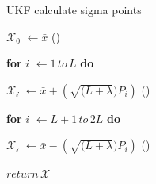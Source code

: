 \documentclass[../Head/report.tex]{subfiles}
\begin{document}
\begin{Pseudo}{UKF calculate sigma points}{}
\begin{Indentation}
	\item $\mathcal{X_0}$  \(\leftarrow \bar{x}\) \qquad {}(\theequation)\label{eq:update_zero_sigma_point}
	\item \textbf{for} $i$ \(\leftarrow 1\, to\, L\) \textbf{do}
        \begin{Indentation}
            \item $\mathcal{X_i}$ \(\leftarrow \bar{x} + \left(\sqrt{(L+\lambda})P_i\right)\) \qquad {}(\theequation)\label{eq:update_ith_sigma_point_plus}
         \end{Indentation}
            
    \item \textbf{for} $i$ \(\leftarrow L+1\, to\, 2L\) \textbf{do}
        \begin{Indentation}
            \item $\mathcal{X_i}$ \(\leftarrow \bar{x} - \left(\sqrt{(L+\lambda})P_i\right)\) \qquad {}(\theequation)\label{eq:update_ith_sigma_point_minus}
    	\end{Indentation}
    	\item $return\, \mathcal{X}$
\end{Indentation}
\end{Pseudo}
\end{document}
